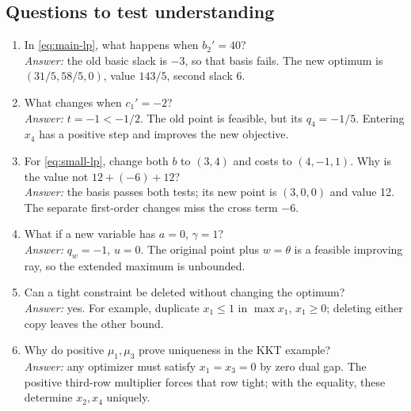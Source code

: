 \documentclass[11pt,a4paper]{article}
\begin{document}
\subsection{Questions to test understanding}
\begin{enumerate}[leftmargin=*]
  \item In \eqref{eq:main-lp}, what happens when $b_2'=40$?\\
        \emph{Answer:} the old basic slack is $-3$, so that basis fails. The new
        optimum is $(31/5,58/5,0)$, value $143/5$, second slack 6.
  \item What changes when $c_1'=-2$?\\
        \emph{Answer:} $t=-1<-1/2$. The old point is feasible, but its $q_4=-1/5$.
        Entering $x_4$ has a positive step and improves the new objective.
  \item For \eqref{eq:small-lp}, change both $b$ to $(3,4)$ and costs to
        $(4,-1,1)$. Why is the value not $12+(-6)+12$?\\
        \emph{Answer:} the basis passes both tests; its new point is $(3,0,0)$ and
        value 12. The separate first-order changes miss the cross term $-6$.
  \item What if a new variable has $a=0$, $\gamma=1$?\\
        \emph{Answer:} $q_w=-1$, $u=0$. The original point plus $w=\theta$ is a
        feasible improving ray, so the extended maximum is unbounded.
  \item Can a tight constraint be deleted without changing the optimum?\\
        \emph{Answer:} yes. For example, duplicate $x_1\leq1$ in $\max x_1$,
        $x_1\geq0$; deleting either copy leaves the other bound.
  \item Why do positive $\mu_1,\mu_3$ prove uniqueness in the KKT example?\\
        \emph{Answer:} any optimizer must satisfy $x_1=x_3=0$ by zero dual gap.
        The positive third-row multiplier forces that row tight; with the equality,
        these determine $x_2,x_4$ uniquely.
\end{enumerate}

\clearpage
\end{document}
